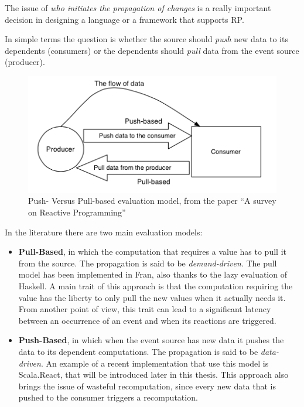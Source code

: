 The issue of \emph{who initiates the propagation of changes} is a really
important decision in designing a language or a framework that supports
RP.

In simple terms the question is whether the source should \emph{push}
new data to its dependents (consumers) or the dependents should
\emph{pull} data from the event source (producer).

\begin{figure}[htbp]
\centering
\includegraphics[scale=0.75]{imgs/eval.png}
\caption{Push- Versus Pull-based evaluation model, from the paper ``A
survey on Reactive Programming''}
\end{figure}

In the literature there are two main evaluation models:

\begin{itemize}
\itemsep1pt\parskip0pt
\item
  \textbf{Pull-Based}, in which the computation that requires a value
  has to pull it from the source. The propagation is said to be
  \emph{demand-driven}. The pull model has been implemented in Fran,
  also thanks to the lazy evaluation of Haskell. A main trait of this
  approach is that the computation requiring the value has the liberty
  to only pull the new values when it actually needs it. From another
  point of view, this trait can lead to a significant latency between an
  occurrence of an event and when its reactions are triggered.
\item
  \textbf{Push-Based}, in which when the event source has new data it
  pushes the data to its dependent computations. The propagation is said
  to be \emph{data-driven}. An example of a recent implementation that
  use this model is Scala.React, that will be introduced later in this
  thesis. This approach also brings the issue of wasteful recomputation,
  since every new data that is pushed to the consumer triggers a
  recomputation.
\end{itemize}

